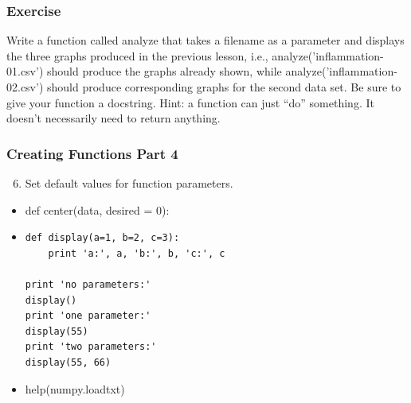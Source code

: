 \documentclass[xcolor=dvipsnames]{beamer}
\begin{document}
\begin{frame}
\frametitle{Exercise}
Write a function called analyze that takes a filename as a parameter and displays the three graphs produced in the previous lesson, i.e., analyze('inflammation-01.csv') should produce the graphs already shown, while analyze('inflammation-02.csv') should produce corresponding graphs for the second data set. Be sure to give your function a docstring. Hint: a function can just ``do'' something.  It doesn't necessarily need to return anything.
\end{frame}



\begin{frame}[fragile]
\frametitle{Creating Functions Part 4}
\begin{enumerate}
\setcounter{enumi}{5}
\item    Set default values for function parameters.
\end{enumerate}
\begin{itemize}
\item def center(data, desired = 0):
\item
\begin{verbatim}
def display(a=1, b=2, c=3):
    print 'a:', a, 'b:', b, 'c:', c

print 'no parameters:'
display()
print 'one parameter:'
display(55)
print 'two parameters:'
display(55, 66)
\end{verbatim}
\item help(numpy.loadtxt)
\end{itemize}
\end{frame}
\end{document}
